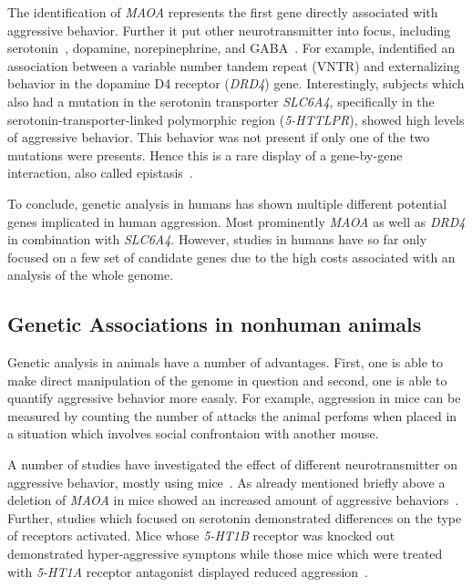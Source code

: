 The identification of \textit{MAOA} represents the first gene directly associated with aggressive behavior.
Further it put other neurotransmitter into focus, including serotonin~\cite{Murphy2008}, dopamine, norepinephrine, and GABA~\cite{Marino2005,Miczek2002}.
For example, \citet{Hohmann2009} indentified an association between a variable number tandem repeat (VNTR) and externalizing behavior in the dopamine D4 receptor (\textit{DRD4}) gene.
Interestingly, subjects which also had a mutation in the serotonin transporter \textit{SLC6A4}, specifically in the serotonin-transporter-linked polymorphic region (\textit{5-HTTLPR}), showed high levels of aggressive behavior.
This behavior was not present if only one of the two mutations were presents.
Hence this is a rare display of a gene-by-gene interaction, also called epistasis~\cite{Anholt2012}.

To conclude, genetic analysis in humans has shown multiple different potential genes implicated in human aggression.
Most prominently \textit{MAOA} as well as \textit{DRD4} in combination with \textit{SLC6A4}.
However, studies in humans have so far only focused on a few set of candidate genes due to the high costs associated with an analysis of the whole genome.

\subsection{Genetic Associations in nonhuman animals}
\label{sub:genetic_associations_in_animals}

Genetic analysis in animals have a number of advantages.
First, one is able to make direct manipulation of the genome in question and second, one is able to quantify aggressive behavior more easaly.
For example, aggression in mice can be measured by counting the number of attacks the animal perfoms when placed in a situation which involves social confrontaion with another mouse.

A number of studies have investigated the effect of different neurotransmitter on aggressive behavior, mostly using mice~\cite{Anholt2012}.
As already mentioned briefly above a deletion of \textit{MAOA} in mice showed an increased amount of aggressive behaviors~\cite{Cases1995b}.
Further, studies which focused on serotonin demonstrated differences on the type of receptors activated.
Mice whose \textit{5-HT1B} receptor was knocked out demonstrated hyper-aggressive symptons while those mice which were treated with \textit{5-HT1A} receptor antagonist displayed reduced aggression~\cite{Saudou1994,Bell1994}.
